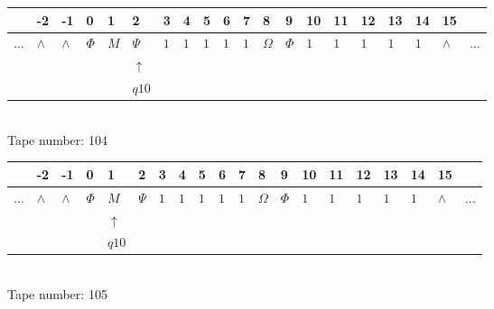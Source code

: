 \documentclass[11pt]{article}
\begin{document}
\begin{table}[H]
\centering
\begin{tabular}{llllllllllllllllllll}
 & -2 & -1 & 0 & 1 & 2 & 3 & 4 & 5 & 6 & 7 & 8 & 9 & 10 & 11 & 12 & 13 & 14 & 15 & \\
\hline
$...$ & \multicolumn{1}{|l|}{$\wedge$} & \multicolumn{1}{|l|}{$\wedge$} & \multicolumn{1}{|l|}{$\Phi$} & \multicolumn{1}{|l|}{$M$} & \multicolumn{1}{|l|}{$\Psi$} & \multicolumn{1}{|l|}{$1$} & \multicolumn{1}{|l|}{$1$} & \multicolumn{1}{|l|}{$1$} & \multicolumn{1}{|l|}{$1$} & \multicolumn{1}{|l|}{$1$} & \multicolumn{1}{|l|}{$\Omega$} & \multicolumn{1}{|l|}{$\Phi$} & \multicolumn{1}{|l|}{$1$} & \multicolumn{1}{|l|}{$1$} & \multicolumn{1}{|l|}{$1$} & \multicolumn{1}{|l|}{$1$} & \multicolumn{1}{|l|}{$1$} & \multicolumn{1}{|l|}{$\wedge$} & $...$\\
\hline
&  &  &  &  & $\uparrow$ &  &  &  &  &  &  &  &  &  &  &  &  &  &  \\
&  &  &  &  & $ q10 $ &  &  &  &  &  &  &  &  &  &  &  &  &  &  \\
\end{tabular}
\\
Tape number: 104
\noindent\makebox[\linewidth]{\hdashrule{\textwidth}{1pt}{1pt}}\end{table}

\begin{table}[H]
\centering
\begin{tabular}{llllllllllllllllllll}
 & -2 & -1 & 0 & 1 & 2 & 3 & 4 & 5 & 6 & 7 & 8 & 9 & 10 & 11 & 12 & 13 & 14 & 15 & \\
\hline
$...$ & \multicolumn{1}{|l|}{$\wedge$} & \multicolumn{1}{|l|}{$\wedge$} & \multicolumn{1}{|l|}{$\Phi$} & \multicolumn{1}{|l|}{$M$} & \multicolumn{1}{|l|}{$\Psi$} & \multicolumn{1}{|l|}{$1$} & \multicolumn{1}{|l|}{$1$} & \multicolumn{1}{|l|}{$1$} & \multicolumn{1}{|l|}{$1$} & \multicolumn{1}{|l|}{$1$} & \multicolumn{1}{|l|}{$\Omega$} & \multicolumn{1}{|l|}{$\Phi$} & \multicolumn{1}{|l|}{$1$} & \multicolumn{1}{|l|}{$1$} & \multicolumn{1}{|l|}{$1$} & \multicolumn{1}{|l|}{$1$} & \multicolumn{1}{|l|}{$1$} & \multicolumn{1}{|l|}{$\wedge$} & $...$\\
\hline
&  &  &  & $\uparrow$ &  &  &  &  &  &  &  &  &  &  &  &  &  &  &  \\
&  &  &  & $ q10 $ &  &  &  &  &  &  &  &  &  &  &  &  &  &  &  \\
\end{tabular}
\\
Tape number: 105
\noindent\makebox[\linewidth]{\hdashrule{\textwidth}{1pt}{1pt}}\end{table}
\end{document}

